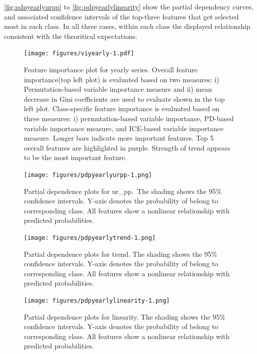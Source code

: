 \documentclass[11pt,a4paper,]{article}
\begin{document}
\autoref{fig:pdpyearlyurpp} to \autoref{fig:pdpyearlylinearity} show the
partial dependency curves, and associated confidence intervals of the
top-three features that get selected most in each class. In all three
cases, within each class the displayed relationship consistent with the
theoritical expectations.

\begin{figure}
\centering
\texttt{[image: figures/viyearly-1.pdf]}
\caption{\label{fig:viyearly}Feature importance plot for yearly series.
Overall feature importance(top left plot) is evaluated based on two
measures: i) Permutation-based variable importance measure and ii) mean
decrease in Gini coefficients are used to evaluate shown in the top left
plot. Class-specific feature importance is evaluated based on three
measures: i) permutation-based variable importance, PD-based variable
importance measure, and ICE-based variable importance measure. Longer
bars indicate more important features. Top 5 overall features are
highlighted in purple. Strength of trend appears to be the most
important feature.}
\end{figure}

\newpage

\begin{figure}
\centering
\texttt{[image: figures/pdpyearlyurpp-1.png]}
\caption{\label{fig:pdpyearlyurpp}Partial dependence plots for ur\_pp.~The
shading shows the 95\% confidence intervals. Y-axis denotes the
probability of belong to corresponding class. All features show a
nonlinear relationship with predicted probabilities.}
\end{figure}

\begin{figure}
\centering
\texttt{[image: figures/pdpyearlytrend-1.png]}
\caption{\label{fig:pdpyearlytrend}Partial dependence plots for trend. The
shading shows the 95\% confidence intervals. Y-axis denotes the
probability of belong to corresponding class. All features show a
nonlinear relationship with predicted probabilities.}
\end{figure}

\begin{figure}
\centering
\texttt{[image: figures/pdpyearlylinearity-1.png]}
\caption{\label{fig:pdpyearlylinearity}Partial dependence plots for
linearity. The shading shows the 95\% confidence intervals. Y-axis
denotes the probability of belong to corresponding class. All features
show a nonlinear relationship with predicted probabilities.}
\end{figure}
\end{document}
